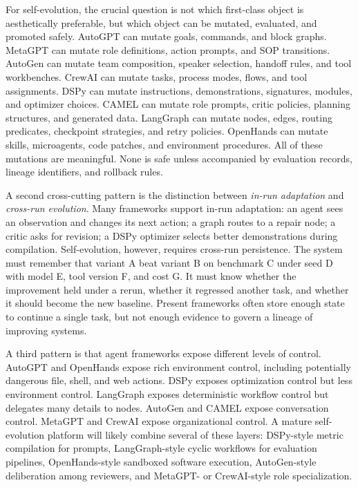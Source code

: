 For self-evolution, the crucial question is not which first-class object is aesthetically preferable, but which object can be mutated, evaluated, and promoted safely.  AutoGPT can mutate goals, commands, and block graphs.  MetaGPT can mutate role definitions, action prompts, and SOP transitions.  AutoGen can mutate team composition, speaker selection, handoff rules, and tool workbenches.  CrewAI can mutate tasks, process modes, flows, and tool assignments.  DSPy can mutate instructions, demonstrations, signatures, modules, and optimizer choices.  CAMEL can mutate role prompts, critic policies, planning structures, and generated data.  LangGraph can mutate nodes, edges, routing predicates, checkpoint strategies, and retry policies.  OpenHands can mutate skills, microagents, code patches, and environment procedures.  All of these mutations are meaningful.  None is safe unless accompanied by evaluation records, lineage identifiers, and rollback rules.

A second cross-cutting pattern is the distinction between \emph{in-run adaptation} and \emph{cross-run evolution}.  Many frameworks support in-run adaptation: an agent sees an observation and changes its next action; a graph routes to a repair node; a critic asks for revision; a DSPy optimizer selects better demonstrations during compilation.  Self-evolution, however, requires cross-run persistence.  The system must remember that variant A beat variant B on benchmark C under seed D with model E, tool version F, and cost G.  It must know whether the improvement held under a rerun, whether it regressed another task, and whether it should become the new baseline.  Present frameworks often store enough state to continue a single task, but not enough evidence to govern a lineage of improving systems.

A third pattern is that agent frameworks expose different levels of control.  AutoGPT and OpenHands expose rich environment control, including potentially dangerous file, shell, and web actions.  DSPy exposes optimization control but less environment control.  LangGraph exposes deterministic workflow control but delegates many details to nodes.  AutoGen and CAMEL expose conversation control.  MetaGPT and CrewAI expose organizational control.  A mature self-evolution platform will likely combine several of these layers: DSPy-style metric compilation for prompts, LangGraph-style cyclic workflows for evaluation pipelines, OpenHands-style sandboxed software execution, AutoGen-style deliberation among reviewers, and MetaGPT- or CrewAI-style role specialization.

